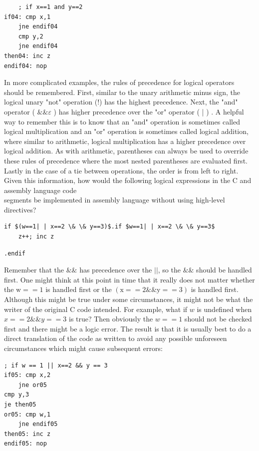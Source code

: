 \documentclass[10pt]{book}
\begin{document}
\begin{verbatim}
    ; if x==1 and y==2
if04: cmp x,1
    jne endif04
    cmp y,2
    jne endif04
then04: inc z
endif04: nop
\end{verbatim}

In more complicated examples, the rules of precedence for logical operators should be remembered. First, similar to the unary arithmetic minus sign, the logical unary "not" operation (!) has the highest precedence. Next, the "and" operator ( $\& \& \varepsilon$ ) has higher precedence over the "or" operator ( | ) . A helpful way to remember this is to know that an "and" operation is sometimes called logical multiplication and an "or" operation is sometimes called logical addition, where similar to arithmetic, logical multiplication has a higher precedence over logical addition. As with arithmetic, parentheses can always be used to override these rules of precedence where the most nested parentheses are evaluated first. Lastly in the case of a tie between operations, the order is from left to right. Given this information, how would the following logical expressions in the C and assembly language code\\
segments be implemented in assembly language without using high-level directives?


\begin{verbatim}
if $(w==1| | x==2 \& \& y==3)$.if $w==1| | x==2 \& \& y==3$
    z++; inc z
\end{verbatim}

\begin{verbatim}
.endif
\end{verbatim}

Remember that the $\& \&$ has precedence over the $|\mid$, so the $\& \&$ should be handled first. One might think at this point in time that it really does not matter whether the $\mathrm{w}==1$ is handled first or the $(\mathrm{x}==2 \& \& \mathrm{y}==3)$ is handled first. Although this might be true under some circumstances, it might not be what the writer of the original C code intended. For example, what if $w$ is undefined when $x==2 \& \& y==3$ is true? Then obviously the $w==1$ should not be checked first and there might be a logic error. The result is that it is usually best to do a direct translation of the code as written to avoid any possible unforeseen circumstances which might cause subsequent errors:

\begin{verbatim}
; if w == 1 || x==2 && y == 3
if05: cmp x,2
    jne or05
cmp y,3
je then05
or05: cmp w,1
    jne endif05
then05: inc z
endif05: nop
\end{verbatim}
\end{document}
